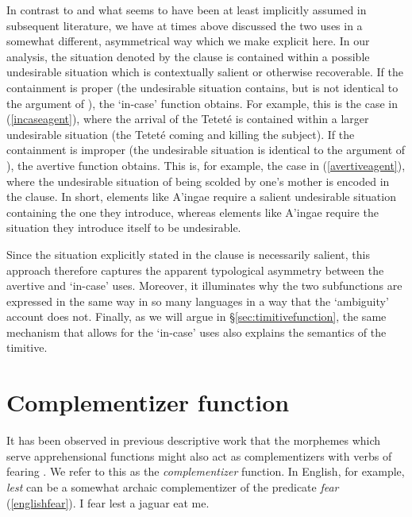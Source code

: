 \documentclass[output=paper,colorlinks,citecolor=brown]{langscibook}
\begin{document}
In contrast to \citet{lichtenberk1995apprehensional} and what seems to have been at least implicitly assumed in subsequent literature, we have at times above discussed the two uses in a somewhat different, asymmetrical way which we make explicit here. In our analysis, the situation denoted by the  clause is contained within a possible undesirable situation which is contextually salient or otherwise recoverable. If the containment is proper (\ie the undesirable situation contains, but is not identical to the argument of \sane), the `in-case' function obtains. For example, this is the case in (\ref{incaseagent}), where the arrival of the Teteté is contained within a larger undesirable situation (the Teteté coming and killing the subject). If the containment is improper (\ie the undesirable situation is identical to the argument of  \sane), the avertive function obtains. This is, for example, the case in (\ref{avertiveagent}), where the undesirable situation of being scolded by one's mother is encoded in the  clause. In short, elements like A'ingae  require a salient undesirable situation containing the one they introduce, whereas elements like A'ingae  require the situation they introduce itself to be undesirable.

Since the situation explicitly stated in the  clause is necessarily salient, this approach therefore captures the apparent typological asymmetry between the avertive and `in-case' uses. Moreover, it illuminates why the two subfunctions are expressed in the same way in so many languages in a way that the `ambiguity' account does not. Finally, as we will argue in \S\ref{sec:timitivefunction}, the same mechanism that allows for the `in-case' uses also explains the semantics of the timitive.




\section{Complementizer function} \label{sec:complementizerfunction}

It has been observed in previous descriptive work that the morphemes which serve apprehensional functions might also act as complementizers with verbs of fearing \citep{lichtenberk1995apprehensional, dobrushina2017fear, wiemer2018major}. We refer to this as the \emph{complementizer} function. In English, for example, \emph{lest} can be a somewhat archaic complementizer of the predicate \emph{fear} (\ref{englishfear}).
    \ea \label{englishfear}
    \glt I fear lest a jaguar eat me.
    \z
\end{document}
